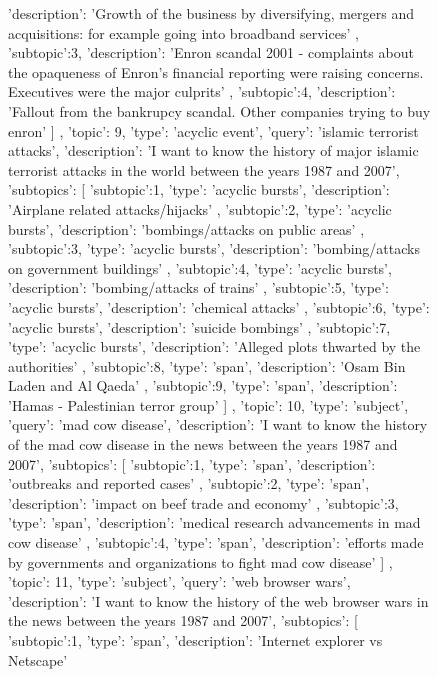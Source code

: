 \begin{figure}[ht]
{\begin{minipage}{\textwidth}
{{				'description': 'Growth of the business by diversifying, mergers and acquisitions: for example going into broadband services'
			},
			{
				'subtopic':3,
				'description': 'Enron scandal 2001 - complaints about the opaqueness of Enron's financial reporting were raising concerns. Executives were the major culprits'
			},
			{
				'subtopic':4,
				'description': 'Fallout from the bankrupcy scandal. Other companies trying to buy enron'
			}
		]
	},
	{	
		'topic': 9,
		'type': 'acyclic event',
		'query': 'islamic terrorist attacks',
		'description': 'I want to know the history of major islamic terrorist attacks in the world between the years 1987 and 2007',
		'subtopics': [
			{
				'subtopic':1,
				'type': 'acyclic bursts',
				'description': 'Airplane related attacks/hijacks'
			},
			{
				'subtopic':2,
				'type': 'acyclic bursts',
				'description': 'bombings/attacks on public areas'
			},
			{
				'subtopic':3,
				'type': 'acyclic bursts',
				'description': 'bombing/attacks on government buildings'
			},
			{
				'subtopic':4,
				'type': 'acyclic bursts',
				'description': 'bombing/attacks of trains'
			},
			{
				'subtopic':5,
				'type': 'acyclic bursts',
				'description': 'chemical attacks'
			},
			{
				'subtopic':6,
				'type': 'acyclic bursts',
				'description': 'suicide bombings'
			},
			{
				'subtopic':7,
				'type': 'acyclic bursts',
				'description': 'Alleged plots thwarted by the authorities'
			},
			{
				'subtopic':8,
				'type': 'span',
				'description': 'Osam Bin Laden and Al Qaeda'
			},
			{
				'subtopic':9,
				'type': 'span',
				'description': 'Hamas - Palestinian terror group'
			}	
		]
	},
	{	
		'topic': 10,
		'type': 'subject',
		'query': 'mad cow disease',
		'description': 'I want to know the history of the mad cow disease in the news between the years 1987 and 2007',
		'subtopics': [
			{
				'subtopic':1,
				'type': 'span',
				'description': 'outbreaks and reported cases'
			},
			{
				'subtopic':2,
				'type': 'span',
				'description': 'impact on beef trade and economy'
			},
			{
				'subtopic':3,
				'type': 'span',
				'description': 'medical research advancements in mad cow disease'
			},
			{
				'subtopic':4,
				'type': 'span',
				'description': 'efforts made by governments and organizations to fight mad cow disease'
			}
		]
	},
	{	
		'topic': 11,
		'type': 'subject',
		'query': 'web browser wars',
		'description': 'I want to know the history of the web browser wars in the news between the years 1987 and 2007',
		'subtopics': [
			{
				'subtopic':1,
				'type': 'span',
				'description': 'Internet explorer vs Netscape'
}}
\end{minipage}}
\end{figure}
